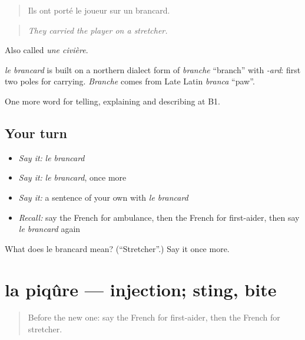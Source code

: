 \begin{quote}
Ils ont porté le joueur sur un brancard.
\end{quote}

\begin{quote}
\emph{They carried the player on a stretcher.}
\end{quote}

Also called \emph{une civière}.

\begin{cousinweb}
\emph{le brancard} is built on a northern dialect form of \emph{branche} \textquotedblleft{}branch\textquotedblright{} with \emph{-ard}: first two poles for carrying. \emph{Branche} comes from Late Latin \emph{branca} \textquotedblleft{}paw\textquotedblright{}.
\end{cousinweb}

\begin{grammarlens}[title={What you've built}]
One more word for telling, explaining and describing at B1.
\end{grammarlens}

\subsection*{Your turn}
\begin{itemize}
\raggedright
  \item \emph{Say it:} \emph{le brancard}
  \item \emph{Say it:} \emph{le brancard}, once more
  \item \emph{Say it:} a sentence of your own with \emph{le brancard}
  \item \emph{Recall:} say the French for ambulance, then the French for first-aider, then say \emph{le brancard} again
\end{itemize}

\begin{tcolorbox}[breakable,colback=teal!4,colframe=teal!35!black,title={Before you move on}]
What does le brancard mean? (\textquotedblleft{}Stretcher\textquotedblright{}.) Say it once more.
\end{tcolorbox}
\section[la piqûre]{la piqûre — injection; sting, bite}

\label{lesson:FR-C484-piqure}



\begin{quote}
Before the new one: say the French for first-aider, then the French for stretcher.
\end{quote}


